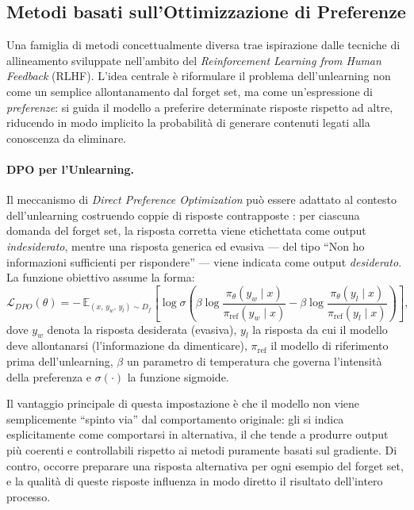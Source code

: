 \subsection{Metodi basati sull'Ottimizzazione di Preferenze}

Una famiglia di metodi concettualmente diversa trae ispirazione dalle tecniche di allineamento sviluppate nell'ambito del \emph{Reinforcement Learning from Human Feedback} (RLHF). L'idea centrale è riformulare il problema dell'unlearning non come un semplice allontanamento dal forget set, ma come un'espressione di \emph{preferenze}: si guida il modello a preferire determinate risposte rispetto ad altre, riducendo in modo implicito la probabilità di generare contenuti legati alla conoscenza da eliminare.

\paragraph{DPO per l'Unlearning.}
Il meccanismo di \emph{Direct Preference Optimization} può essere adattato al contesto dell'unlearning costruendo coppie di risposte contrapposte \cite{openunlearning2025}: per ciascuna domanda del forget set, la risposta corretta viene etichettata come output \emph{indesiderato}, mentre una risposta generica ed evasiva — del tipo ``Non ho informazioni sufficienti per rispondere'' — viene indicata come output \emph{desiderato}. La funzione obiettivo assume la forma:
\begin{equation}
    \mathcal{L}_{DPO}(\theta) = -\,\mathbb{E}_{(x,\, y_w,\, y_l) \sim D_f}\!\left[\log \sigma\!\left(\beta \log \frac{\pi_\theta(y_w \mid x)}{\pi_{\mathrm{ref}}(y_w \mid x)} - \beta \log \frac{\pi_\theta(y_l \mid x)}{\pi_{\mathrm{ref}}(y_l \mid x)}\right)\right],
    \label{eq:dpo_unlearning}
\end{equation}
dove $y_w$ denota la risposta desiderata (evasiva), $y_l$ la risposta da cui il modello deve allontanarsi (l'informazione da dimenticare), $\pi_{\mathrm{ref}}$ il modello di riferimento prima dell'unlearning, $\beta$ un parametro di temperatura che governa l'intensità della preferenza e $\sigma(\cdot)$ la funzione sigmoide.

Il vantaggio principale di questa impostazione è che il modello non viene semplicemente ``spinto via'' dal comportamento originale: gli si indica esplicitamente come comportarsi in alternativa, il che tende a produrre output più coerenti e controllabili rispetto ai metodi puramente basati sul gradiente. Di contro, occorre preparare una risposta alternativa per ogni esempio del forget set, e la qualità di queste risposte influenza in modo diretto il risultato dell'intero processo.

